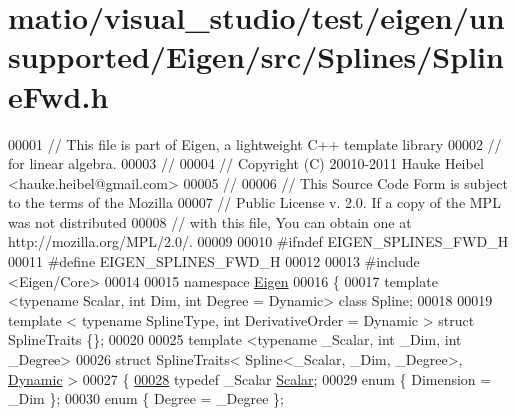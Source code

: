 \hypertarget{matio_2visual__studio_2test_2eigen_2unsupported_2_eigen_2src_2_splines_2_spline_fwd_8h_source}{}\section{matio/visual\+\_\+studio/test/eigen/unsupported/\+Eigen/src/\+Splines/\+Spline\+Fwd.h}
\label{matio_2visual__studio_2test_2eigen_2unsupported_2_eigen_2src_2_splines_2_spline_fwd_8h_source}

\begin{DoxyCode}
00001 \textcolor{comment}{// This file is part of Eigen, a lightweight C++ template library}
00002 \textcolor{comment}{// for linear algebra.}
00003 \textcolor{comment}{//}
00004 \textcolor{comment}{// Copyright (C) 20010-2011 Hauke Heibel <hauke.heibel@gmail.com>}
00005 \textcolor{comment}{//}
00006 \textcolor{comment}{// This Source Code Form is subject to the terms of the Mozilla}
00007 \textcolor{comment}{// Public License v. 2.0. If a copy of the MPL was not distributed}
00008 \textcolor{comment}{// with this file, You can obtain one at http://mozilla.org/MPL/2.0/.}
00009 
00010 \textcolor{preprocessor}{#ifndef EIGEN\_SPLINES\_FWD\_H}
00011 \textcolor{preprocessor}{#define EIGEN\_SPLINES\_FWD\_H}
00012 
00013 \textcolor{preprocessor}{#include <Eigen/Core>}
00014 
00015 \textcolor{keyword}{namespace }\hyperlink{namespace_eigen}{Eigen}
00016 \{
00017     \textcolor{keyword}{template} <\textcolor{keyword}{typename} Scalar, \textcolor{keywordtype}{int} Dim, \textcolor{keywordtype}{int} Degree = Dynamic> \textcolor{keyword}{class }Spline;
00018 
00019     \textcolor{keyword}{template} < \textcolor{keyword}{typename} SplineType, \textcolor{keywordtype}{int} DerivativeOrder = Dynamic > \textcolor{keyword}{struct }SplineTraits \{\};
00020 
00025     \textcolor{keyword}{template} <\textcolor{keyword}{typename} \_Scalar, \textcolor{keywordtype}{int} \_Dim, \textcolor{keywordtype}{int} \_Degree>
00026     \textcolor{keyword}{struct }SplineTraits< Spline<\_Scalar, \_Dim, \_Degree>, \hyperlink{namespace_eigen_ad81fa7195215a0ce30017dfac309f0b2}{Dynamic} >
00027     \{
\hyperlink{group___splines___module_aa440dee6a559821c867c94ee4bbf60f3}{00028}       \textcolor{keyword}{typedef} \_Scalar \hyperlink{group___splines___module_aa440dee6a559821c867c94ee4bbf60f3}{Scalar}; 
00029       \textcolor{keyword}{enum} \{ Dimension = \_Dim  \};
00030       \textcolor{keyword}{enum} \{ Degree = \_Degree  \};

\end{DoxyCode}
